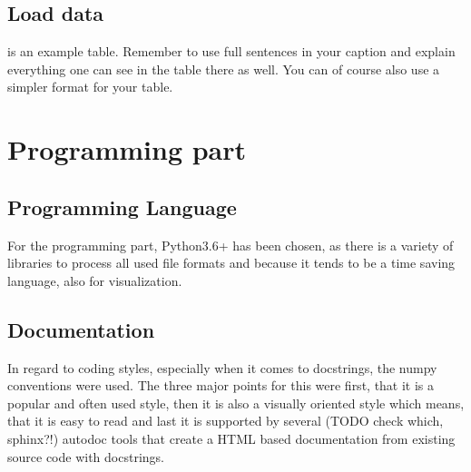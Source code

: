 \subsection{Load data}



 is an example table. Remember to use full sentences in your caption and explain everything one can see in the table there as well. You can of course also use a simpler format for your table.



\section{Programming part}
\label{sec:prog}

\subsection{Programming Language}

For the programming part, Python3.6+ has been chosen, as there is a variety of libraries to process all used file formats and because it tends to be a time saving language, also for visualization.\\

\subsection{Documentation}

In regard to coding styles, especially when it comes to docstrings, the numpy conventions were used. The three major points for this were first, that it is a popular and often used style, then it is also a visually oriented style which means, that it is easy to read and last it is supported by several (TODO check which, sphinx?!) autodoc tools that create a HTML based documentation from existing source code with docstrings.\\


